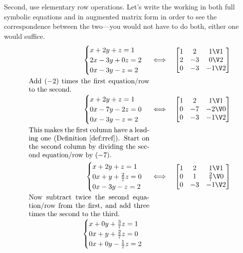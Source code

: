 \begin{example}
\begin{solution}
Second, use elementary row operations.
Let's write the working in both full symbolic equations and in augmented matrix form in order to see the correspondence between the two---you would not have to do both, either one would suffice.
\begin{eqnarray*}
\begin{cases}
x+2y+z=1\\ 2x-3y+0z=2\\ 0x-3y-z=2
\end{cases}
&\iff&%
\begin{bmatrix} 1&2&1\V1\\2&-3&0\V2\\0&-3&-1\V2 \end{bmatrix}
\\[0ex plus 1ex]
\parbox{0.5\linewidth}{Add \((-2)\) times the first equation\slash row to the second.}
\\[0ex plus 1ex]
\begin{cases}
x+2y+z=1\\ 0x-7y-2z=0\\ 0x-3y-z=2
\end{cases}
&\iff&%
\begin{bmatrix} 1&2&1\V1\\0&-7&-2\V0\\0&-3&-1\V2 \end{bmatrix}
\\[0ex plus 1ex]
\parbox{0.5\linewidth}{This makes the first column have a leading one (Definition~\ref{def:rref}).  Start on the second column by dividing the second equation\slash row by~\((-7)\).}
\\[0ex plus 1ex]
\begin{cases}
x+2y+z=1\\ 0x+y+\frac27z=0\\ 0x-3y-z=2
\end{cases}
&\iff&%
\begin{bmatrix} 1&2&1\V1\\0&1&\frac27\V0\\0&-3&-1\V2 \end{bmatrix}
\\[0ex plus 1ex]
\parbox{0.5\linewidth}{Now subtract twice the second equation\slash row from the first, and add three times the second to the third.}
\\[0ex plus 1ex]
\begin{cases}
x+0y+\frac37z=1\\ 0x+y+\frac27z=0\\ 0x+0y-\frac17z=2

\end{cases}
\end{eqnarray*}
\end{solution}
\end{example}
